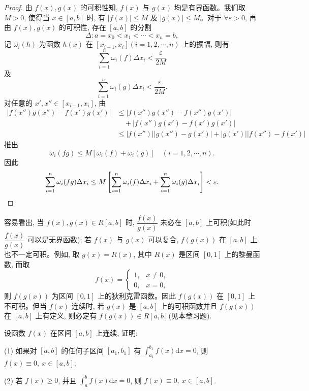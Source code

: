 \begin{proof}
由 $f(x),g(x)$ 的可积性知, $f(x)$ 与 $g(x)$ 均是有界函数。我们取 $M>0$, 使得当 $x\in[a,b]$ 时, 有 $|f(x)|\leq M$ 及 $|g(x)|\leq M$。对于 $\forall\varepsilon>0$, 再由 $f(x),g(x)$ 的可积性, 存在 $[a,b]$ 的分割
\[
  \Delta:a=x_0<x_1<\cdots<x_n=b,
\]
记 $\omega_i(h)$ 为函数 $h(x)$ 在 $[x_{i-1},x_i](i=1,2,\cdots,n)$ 上的振幅, 则有
\begin{equation}
  \sum_{i=1}^n \omega_i(f)\Delta x_i<\frac{\varepsilon}{2M}
  \label{eq:ma-7-3-5}
\end{equation}
及
\begin{equation}
  \sum_{i=1}^n \omega_i(g)\Delta x_i<\frac{\varepsilon}{2M}.
  \label{eq:ma-7-3-6}
\end{equation}
对任意的 $x',x''\in[x_{i-1},x_i]$, 由
\[
\begin{aligned}
  |f(x'')g(x'')-f(x')g(x')|
  &\leq |f(x'')g(x'')-f(x'')g(x')|\\
  &\quad+|f(x'')g(x')-f(x')g(x')|\\
  &\leq |f(x'')||g(x'')-g(x')|+|g(x')||f(x'')-f(x')|
\end{aligned}
\]
推出
\[
  \omega_i(fg)\leq M[\omega_i(f)+\omega_i(g)]
  \quad(i=1,2,\cdots,n).
\]
因此
\[
  \sum_{i=1}^n\omega_i(fg)\Delta x_i
  \leq M\left[\sum_{i=1}^n\omega_i(f)\Delta x_i+\sum_{i=1}^n\omega_i(g)\Delta x_i\right]<\varepsilon.
\qedhere
\]
\end{proof}


容易看出, 当 $f(x),g(x)\in R[a,b]$ 时, $\dfrac{f(x)}{g(x)}$ 未必在 $[a,b]$ 上可积(如此时 $\dfrac{f(x)}{g(x)}$ 可以是无界函数); 若 $f(x)$ 与 $g(x)$ 可以复合, $f(g(x))$ 在 $[a,b]$ 上也不一定可积。例如, 取 $g(x)=R(x)$, 其中 $R(x)$ 是区间 $[0,1]$ 上的黎曼函数, 而取
\[
  f(x)=
  \begin{cases}
    1, & x\neq0,\\
    0, & x=0,
  \end{cases}
\]
则 $f(g(x))$ 为区间 $[0,1]$ 上的狄利克雷函数。因此 $f(g(x))$ 在 $[0,1]$ 上不可积。但当 $f(x)$ 连续时, 若 $g(x)$ 是 $[a,b]$ 上的可积函数并且 $f(g(x))$ 在 $[a,b]$ 上有定义, 则必定有 $f(g(x))\in R[a,b]$(见本章习题).

\begin{example}\label{example:ma-7-3-2}
设函数 $f(x)$ 在区间 $[a,b]$ 上连续, 证明:

(1) 如果对 $[a,b]$ 的任何子区间 $[a_1,b_1]$ 有 $\int_{a_1}^{b_1}f(x)\mathrm dx=0$, 则 $f(x)\equiv0,\ x\in[a,b]$;

(2) 若 $f(x)\geq0$, 并且 $\int_a^b f(x)\mathrm dx=0$, 则 $f(x)\equiv0,\ x\in[a,b]$.
\end{example}



